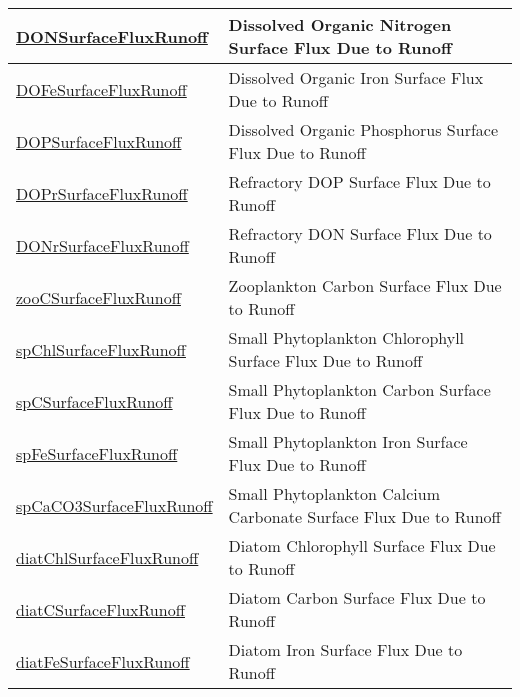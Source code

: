 {\begin{center}
\begin{longtable}{| p{2.0in} | p{4.0in} |}
    \hline
    \hyperref[subsec:var_sec_tracersSurfaceFlux_DONSurfaceFluxRunoff]{DONSurfaceFluxRunoff} & Dissolved Organic Nitrogen Surface Flux Due to Runoff \\
    \hline
    \hyperref[subsec:var_sec_tracersSurfaceFlux_DOFeSurfaceFluxRunoff]{DOFeSurfaceFluxRunoff} & Dissolved Organic Iron Surface Flux Due to Runoff \\
    \hline
    \hyperref[subsec:var_sec_tracersSurfaceFlux_DOPSurfaceFluxRunoff]{DOPSurfaceFluxRunoff} & Dissolved Organic Phosphorus Surface Flux Due to Runoff \\
    \hline
    \hyperref[subsec:var_sec_tracersSurfaceFlux_DOPrSurfaceFluxRunoff]{DOPrSurfaceFluxRunoff} & Refractory DOP Surface Flux Due to Runoff \\
    \hline
    \hyperref[subsec:var_sec_tracersSurfaceFlux_DONrSurfaceFluxRunoff]{DONrSurfaceFluxRunoff} & Refractory DON Surface Flux Due to Runoff \\
    \hline
    \hyperref[subsec:var_sec_tracersSurfaceFlux_zooCSurfaceFluxRunoff]{zooCSurfaceFluxRunoff} & Zooplankton Carbon Surface Flux Due to Runoff \\
    \hline
    \hyperref[subsec:var_sec_tracersSurfaceFlux_spChlSurfaceFluxRunoff]{spChlSurfaceFluxRunoff} & Small Phytoplankton Chlorophyll Surface Flux Due to Runoff \\
    \hline
    \hyperref[subsec:var_sec_tracersSurfaceFlux_spCSurfaceFluxRunoff]{spCSurfaceFluxRunoff} & Small Phytoplankton Carbon Surface Flux Due to Runoff \\
    \hline
    \hyperref[subsec:var_sec_tracersSurfaceFlux_spFeSurfaceFluxRunoff]{spFeSurfaceFluxRunoff} & Small Phytoplankton Iron Surface Flux Due to Runoff \\
    \hline
    \hyperref[subsec:var_sec_tracersSurfaceFlux_spCaCO3SurfaceFluxRunoff]{spCaCO3SurfaceFluxRunoff} & Small Phytoplankton Calcium Carbonate Surface Flux Due to Runoff \\
    \hline
    \hyperref[subsec:var_sec_tracersSurfaceFlux_diatChlSurfaceFluxRunoff]{diatChlSurfaceFluxRunoff} & Diatom Chlorophyll Surface Flux Due to Runoff \\
    \hline
    \hyperref[subsec:var_sec_tracersSurfaceFlux_diatCSurfaceFluxRunoff]{diatCSurfaceFluxRunoff} & Diatom Carbon Surface Flux Due to Runoff \\
    \hline
    \hyperref[subsec:var_sec_tracersSurfaceFlux_diatFeSurfaceFluxRunoff]{diatFeSurfaceFluxRunoff} & Diatom Iron Surface Flux Due to Runoff \\

\end{longtable}
\end{center}}
